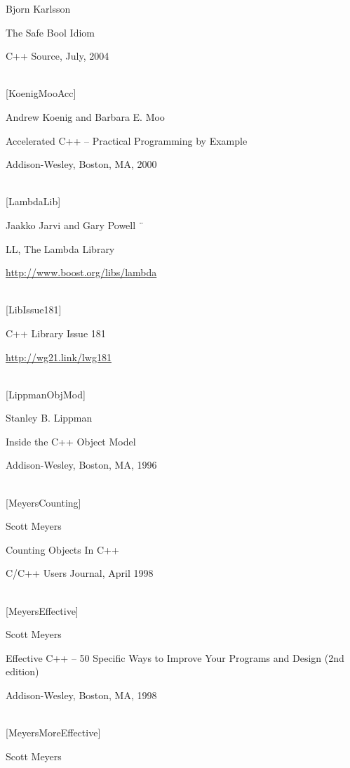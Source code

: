 Bjorn Karlsson

The Safe Bool Idiom

C++ Source, July, 2004

\hspace*{\fill} \\ %
{[KoenigMooAcc]}

Andrew Koenig and Barbara E. Moo

Accelerated C++ – Practical Programming by Example

Addison-Wesley, Boston, MA, 2000

\hspace*{\fill} \\ %
{[LambdaLib]}

Jaakko Jarvi and Gary Powell ¨

LL, The Lambda Library

\url{http://www.boost.org/libs/lambda}

\hspace*{\fill} \\ %
{[LibIssue181]}

C++ Library Issue 181

\url{http://wg21.link/lwg181}

\hspace*{\fill} \\ %
{[LippmanObjMod]}

Stanley B. Lippman

Inside the C++ Object Model

Addison-Wesley, Boston, MA, 1996

\hspace*{\fill} \\ %
{[MeyersCounting]}

Scott Meyers

Counting Objects In C++

C/C++ Users Journal, April 1998

\hspace*{\fill} \\ %
{[MeyersEffective]}

Scott Meyers

Effective C++ – 50 Specific Ways to Improve Your Programs and Design (2nd edition)

Addison-Wesley, Boston, MA, 1998

\hspace*{\fill} \\ %
{[MeyersMoreEffective]}

Scott Meyers

